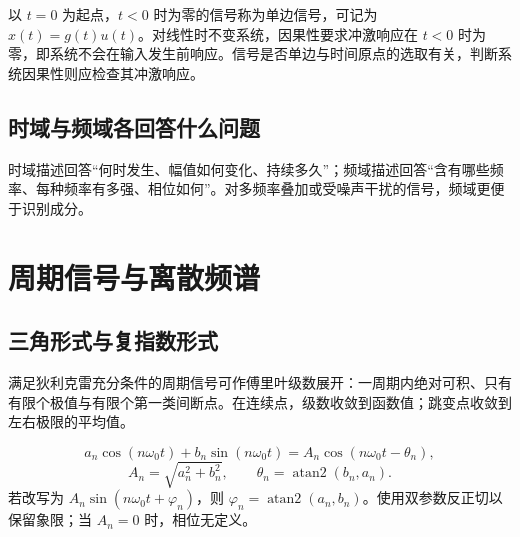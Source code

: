 以 $t=0$ 为起点，$t<0$ 时为零的信号称为单边信号，可记为 $x(t)=g(t)u(t)$。对线性时不变系统，因果性要求冲激响应在 $t<0$ 时为零，即系统不会在输入发生前响应。信号是否单边与时间原点的选取有关，判断系统因果性则应检查其冲激响应。

\clearpage
\subsection{时域与频域各回答什么问题}

时域描述回答“何时发生、幅值如何变化、持续多久”；频域描述回答“含有哪些频率、每种频率有多强、相位如何”。对多频率叠加或受噪声干扰的信号，频域更便于识别成分。


\section{周期信号与离散频谱}

\subsection{三角形式与复指数形式}

满足狄利克雷充分条件的周期信号可作傅里叶级数展开：一周期内绝对可积、只有有限个极值与有限个第一类间断点。在连续点，级数收敛到函数值；跳变点收敛到左右极限的平均值。


\[
a_n\cos(n\omega_0t)+b_n\sin(n\omega_0t)
=A_n\cos(n\omega_0t-\theta_n),
\]
\[
A_n=\sqrt{a_n^2+b_n^2},\qquad \theta_n=\operatorname{atan2}(b_n,a_n).
\]
若改写为 $A_n\sin(n\omega_0t+\varphi_n)$，则 $\varphi_n=\operatorname{atan2}(a_n,b_n)$。使用双参数反正切以保留象限；当 $A_n=0$ 时，相位无定义。

